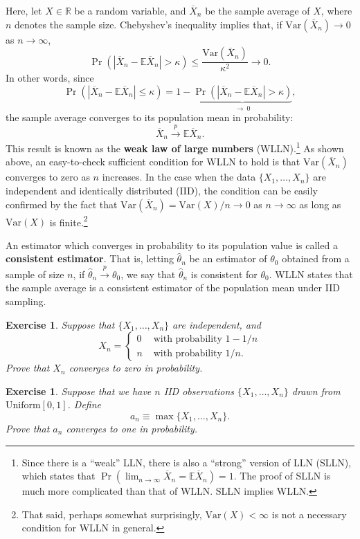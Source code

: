 \documentclass[10.5pt, A4paper, openany, uplatex]{book}
\newcommand{\mbb}{\mathbb}
\newcommand{\E}{\mathbb{E}}
\newcommand{\Var}{\mathrm{Var}}
\renewcommand{\hat}{\widehat}
\renewcommand{\bar}{\overline}
\newtheorem{exercise}[theorem]{Exercise}
\numberwithin{equation}{section}
\begin{document}
Here, let $X \in \mbb{R}$ be a random variable, and $\bar X_n$ be the sample average of $X$, where $n$ denotes the sample size.
Chebyshev's inequality implies that, if $\Var(\bar X_n) \to 0$ as $n \to \infty$,
\[
\Pr( |\bar X_n - \E \bar X_n | > \kappa ) \leq \frac{\Var(\bar X_n)}{\kappa^2} \to 0.
\]
In other words, since 
\[
	\Pr( |\bar X_n - \E\bar X_n | \le \kappa ) = 1 - \underbrace{\Pr( |\bar X_n - \E\bar X_n | > \kappa )}_{\to \: 0},
\]
the sample average converges to its population mean in probability:
\[
\bar X_n \overset{p}{\to} \E\bar X_n.
\]
This result is known as the \textbf{weak law of large numbers} (WLLN).\footnote{	
	Since there is a ``weak'' LLN, there is also a ``strong'' version of LLN (SLLN), which states that $\Pr(\lim_{n \to \infty} \bar X_n = \E \bar X_n) = 1$.
	The proof of SLLN is much more complicated than that of WLLN.
	SLLN implies WLLN.}
As shown above, an easy-to-check sufficient condition for WLLN to hold is that $\Var(\bar X_n)$ converges to zero as $n$ increases.
In the case when the data $\{X_1, \ldots , X_n\}$ are independent and identically distributed (IID), the condition can be easily confirmed by the fact that $\Var(\bar X_n) = \Var(X)/n \to 0$ as $n \to \infty$ as long as $\Var(X)$ is finite.\footnote{
	That said, perhaps somewhat surprisingly, $\Var(X) < \infty$ is not a necessary condition for WLLN in general.
	}
\bigskip

An estimator which converges in probability to its population value is called a \textbf{consistent estimator}.
That is, letting $\hat\theta_n$ be an estimator of $\theta_0$ obtained from a sample of size $n$, if $\hat\theta_n \overset{p}{\to} \theta_0$, we say that $\hat\theta_n$ is consistent for $\theta_0$.
WLLN states that the sample average is a consistent estimator of the population mean under IID sampling.

\begin{framed}
\begin{exercise}\upshape
	Suppose that $\{X_1, \ldots, X_n\}$ are independent, and
	\[
	X_n = \left\{\begin{array}{ll}
	0 & \text{ with probability } 1-1/n\\
	n & \text{ with probability } 1/n.
	\end{array}\right.
	\]
	Prove that $X_n$ converges to zero in probability.
\end{exercise}
\begin{exercise}\upshape
	Suppose that we have $n$ IID observations $\{X_1, \ldots, X_n\}$ drawn from $\text{Uniform}[0,1]$.
	Define 
	\[
	a_n \equiv \max\{X_1, \ldots, X_n\}.
	\]
	Prove that $a_n$ converges to one in probability.
\end{exercise}
\end{framed}
\end{document}
